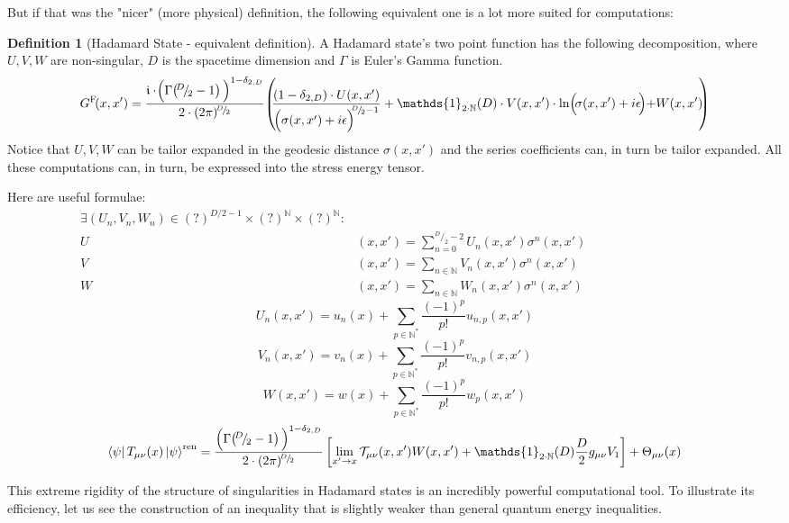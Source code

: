 \documentclass[a4paper,11pt]{article}
\numberwithin{equation}{section}
\theoremstyle{definition}
\newtheorem{definition}{Definition}
\begin{document}
But if that was the "nicer" (more physical) definition, the following equivalent one is a lot more suited for computations:
\begin{definition}[Hadamard State - equivalent definition]
    A Hadamard state's two point function has the following decomposition, where $U,V,W$ are non-singular, $D$ is the spacetime dimension and $\Gamma$ is Euler's Gamma function.
    \begin{equation*}
G^\mathrm{F}\!(x,x')=\frac{\mathfrak{i}\cdot\!\Bigl(\Gamma\!\left(\!^D\!/_{\!2}-1\right)\Bigl)^{1-\delta_{2,D}}}{2\cdot(2\pi)^{\!^D\!/_{\!2}}}\!\left(\!\!\frac{(1-\delta_{2,D})\cdot U(x,x')}{\Bigl(\sigma(x,x')+i\epsilon\Bigl)^{\!\!^D\!/_{\!2}-1}}+\mathds{1}_{2\cdot \mathbb{N}}(D) \cdot V(x,x')\cdot\mathrm{ln}\Bigl(\!\sigma(x,x')+i\epsilon\!\Bigl)+W(x,x')\!\!\right)
\end{equation*}
Notice that $U,V,W$ can be tailor expanded in the geodesic distance $\sigma(x,x')$ and the series coefficients can, in turn be tailor expanded. All these computations can, in turn, be expressed into the stress energy tensor.

Here are useful formulae:
\begin{align*}
    \exists (U_n, V_n, W_n) \in (?)^{D/2-1}\times(?)^\mathbb{N}\times(?)^\mathbb{N}:&\\
    U&(x,x')=\sum_{n=0}^{^D\!/_{\!2}-2}U_n(x,x')\sigma^n(x,x')\\
    V&(x,x')=\sum_{n\in\mathbb{N}}V_n(x,x')\sigma^n(x,x')\\
    W&(x,x')=\sum_{n\in\mathbb{N}}W_n(x,x')\sigma^n(x,x')
    \quad\quad\quad\quad\quad\quad\quad\quad\quad\quad
\end{align*}
\begin{equation}
    U_n(x,x')=u_n(x)+\sum_{p\in\mathbb{N}^*}\frac{(-1)^p}{p!}u_{n,p}(x,x')
\end{equation}
\begin{equation}
    V_n(x,x')=v_n(x)+\sum_{p\in\mathbb{N}^*}\frac{(-1)^p}{p!}v_{n,p}(x,x')
\end{equation}
\begin{equation}
    W(x,x')=w(x)+\sum_{p\in\mathbb{N}^*}\frac{(-1)^p}{p!}w_{p}(x,x')
\end{equation}
\begin{equation}
    \bra{\psi}T_{\mu\nu}(x)\ket{\psi}^\mathrm{ren} = \frac{\Bigl(\Gamma\!\left(\!^D\!/_{\!2}-1\right)\Bigl)^{1-\delta_{2,D}}}{2\cdot(2\pi)^{\!^D\!/_{\!2}}}\left[\lim_{x'\to x}\mathcal{T}_{\mu\nu}(x,x')W(x,x')+\mathds{1}_{2\cdot \mathbb{N}}(D)\frac{D}{2}g_{\mu\nu}V_1\right]+\Theta_{\mu\nu}(x)
\end{equation}
\end{definition}
This extreme rigidity of the structure of singularities in Hadamard states is an incredibly powerful computational tool. To illustrate its efficiency, let us see the construction of an inequality that is slightly weaker than general quantum energy inequalities.
\end{document}
